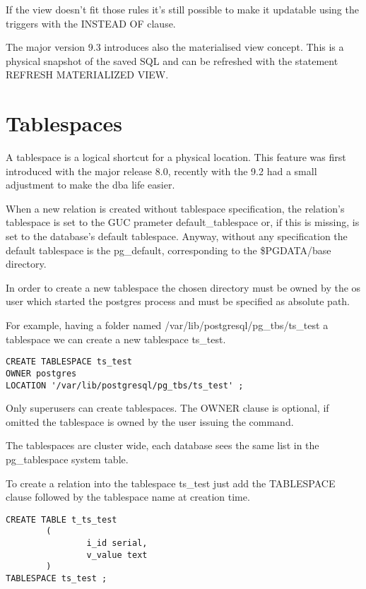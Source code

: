 If the view doesn't fit those rules it's still possible to make it updatable 
using the triggers with the INSTEAD OF clause.

The major version 9.3 introduces also the materialised view concept. This is a 
physical snapshot of the saved SQL and can be refreshed with the statement 
REFRESH MATERIALIZED VIEW.  


\section{Tablespaces}
\label{sub:TBS-LOGICAL}
A tablespace is a logical shortcut for a physical location. 
This feature was first introduced with the major release 8.0, recently with the 
9.2 had a small adjustment to make the dba life easier.

When a new relation is created without tablespace specification, the relation's
tablespace is set to the GUC prameter default\_tablespace or, if this is 
missing, is set to the database's default tablespace. 
Anyway, without any specification the default tablespace is the pg\_default, 
corresponding to the \$PGDATA/base directory.

In order to create a new tablespace the chosen directory must be owned by 
the os user which started the postgres process and must be specified as 
absolute path. 

For example, having a folder named /var/lib/postgresql/pg\_tbs/ts\_test a 
tablespace we can create a new tablespace ts\_test.

\begin{lstlisting}[style=pgsql]
CREATE TABLESPACE ts_test 
OWNER postgres
LOCATION '/var/lib/postgresql/pg_tbs/ts_test' ;

\end{lstlisting}

Only superusers can create tablespaces. The OWNER clause is optional, if 
omitted the tablespace is owned by the user issuing the command.

The tablespaces are cluster wide, each database sees the same list in the 
pg\_tablespace system table.

To create a relation into the tablespace ts\_test just add the TABLESPACE 
clause followed by the tablespace name at creation 
time.

\begin{lstlisting}[style=pgsql]
CREATE TABLE t_ts_test
        (
                i_id serial,
                v_value text
        )
TABLESPACE ts_test ;

\end{lstlisting}

